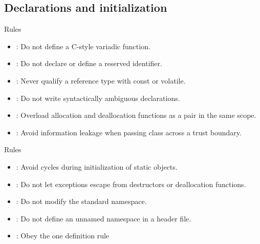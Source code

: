 \subsection{Declarations and initialization}

\begin{frame}[t]{Rules}
\begin{itemize}
  \item {}: Do not define a C-style variadic function.
  \vfill
  \item {}: Do not declare or define a reserved identifier.
  \vfill
  \item {}: Never qualify a reference type with const or volatile.
  \vfill
  \item {}: Do not write syntactically ambiguous declarations.
  \vfill
  \item {}: Overload allocation and deallocation functions as a pair in the same scope.
  \vfill
  \item {}: Avoid information leakage when passing class across a trust boundary.
\end{itemize}
\end{frame}


\begin{frame}[t]{Rules}
\begin{itemize}
  \item {}: Avoid cycles during initialization of static objects.
  \vfill
  \item {}: Do not let exceptions escape from destructors or deallocation functions.
  \vfill
  \item {}: Do not modify the standard namespace.
  \vfill
  \item {}: Do not define an unnamed namespace in a header file.
  \vfill
  \item {}: Obey the one definition rule
\end{itemize}
\end{frame}


